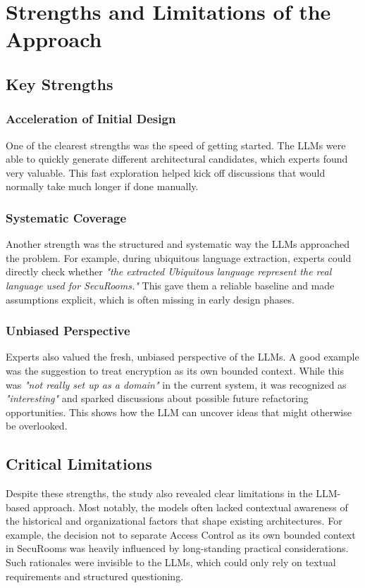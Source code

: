 \section{Strengths and Limitations of the Approach}

\subsection{Key Strengths}

\subsubsection{Acceleration of Initial Design}
One of the clearest strengths was the speed of getting started. The LLMs were able to quickly generate different architectural candidates, which experts found very valuable. This fast exploration helped kick off discussions that would normally take much longer if done manually.

\subsubsection{Systematic Coverage}
Another strength was the structured and systematic way the LLMs approached the problem. For example, during ubiquitous language extraction, experts could directly check whether \textit{"the extracted Ubiquitous language represent the real language used for SecuRooms."} This gave them a reliable baseline and made assumptions explicit, which is often missing in early design phases.

\subsubsection{Unbiased Perspective}
Experts also valued the fresh, unbiased perspective of the LLMs. A good example was the suggestion to treat encryption as its own bounded context. While this was \textit{"not really set up as a domain"} in the current system, it was recognized as \textit{"interesting"} and sparked discussions about possible future refactoring opportunities. This shows how the LLM can uncover ideas that might otherwise be overlooked.

\subsection{Critical Limitations}

Despite these strengths, the study also revealed clear limitations in the LLM-based approach. Most notably, the models often lacked contextual awareness of the historical and organizational factors that shape existing architectures. For example, the decision not to separate Access Control as its own bounded context in SecuRooms was heavily influenced by long-standing practical considerations. Such rationales were invisible to the LLMs, which could only rely on textual requirements and structured questioning.


